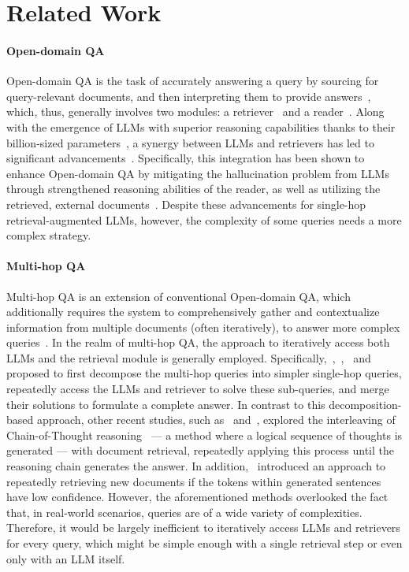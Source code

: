 
\section{Related Work}

\paragraph{Open-domain QA}
Open-domain QA is the task of accurately answering a query by sourcing for query-relevant documents, and then interpreting them to provide answers~\cite{DBLP:conf/acl/ChenFWB17, ODQA/survey}, which, thus, generally involves two modules: a retriever~\cite{DPR, ANCE} and a reader~\cite{BERTserini, FiD, DBLP:conf/emnlp/JeongBCHP23}. 
Along with the emergence of LLMs with superior reasoning capabilities thanks to their billion-sized parameters~\cite{EmergentLLMs}, a synergy between LLMs and retrievers has led to significant advancements~\cite{internet-QA, ram2023ralm}. Specifically, this integration has been shown to enhance Open-domain QA by mitigating the hallucination problem from LLMs through strengthened reasoning abilities of the reader, as well as utilizing the retrieved, external documents~\cite{DBLP:conf/emnlp/ChoSJP23}. Despite these advancements for single-hop retrieval-augmented LLMs, however, the complexity of some queries needs a more complex strategy.

\paragraph{Multi-hop QA}
Multi-hop QA is an extension of conventional Open-domain QA, which additionally requires the system to comprehensively gather and contextualize information from multiple documents (often iteratively), to answer more complex queries~\cite{musique, hotpotqa}. In the realm of multi-hop QA, the approach to iteratively access both LLMs and the retrieval module is generally employed. Specifically,~\citet{dsp},~\citet{self-ask},~\citet{DBLP:conf/ecir/PereiraFLN23} and~\citet{decomp} proposed to first decompose the multi-hop queries into simpler single-hop queries, repeatedly access the LLMs and retriever to solve these sub-queries, and merge their solutions to formulate a complete answer. In contrast to this decomposition-based approach, other recent studies, such as~\citet{react} and~\citet{ircot}, explored the interleaving of Chain-of-Thought reasoning~\cite{cot} — a method where a logical sequence of thoughts is generated — with document retrieval, repeatedly applying this process until the reasoning chain generates the answer. In addition,~\citet{ActiveRetrieval} introduced an approach to repeatedly retrieving new documents if the tokens within generated sentences have low confidence. However, the aforementioned methods overlooked the fact that, in real-world scenarios, queries are of a wide variety of complexities. Therefore, it would be largely inefficient to iteratively access LLMs and retrievers for every query, which might be simple enough with a single retrieval step or even only with an LLM itself. 

